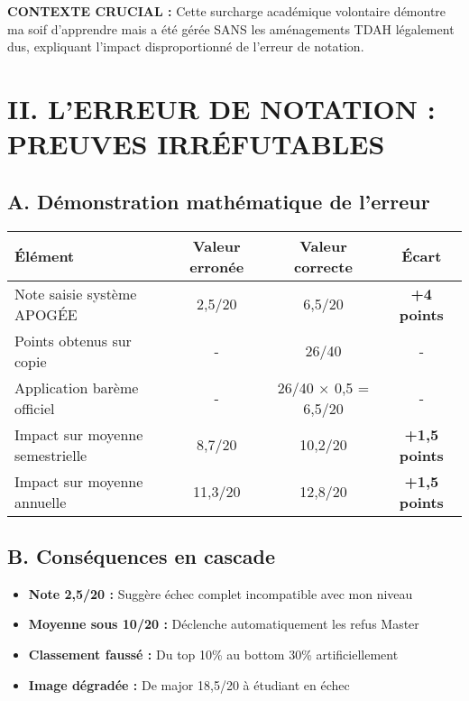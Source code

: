 \documentclass[12pt,french]{scrlttr2}
\begin{document}
\begin{letter}
\colorbox{yellow!20}{\parbox{0.95\textwidth}{
\textbf{CONTEXTE CRUCIAL :} Cette surcharge académique volontaire démontre ma soif d'apprendre mais a été gérée SANS les aménagements TDAH légalement dus, expliquant l'impact disproportionné de l'erreur de notation.
}}

\section*{II. L'ERREUR DE NOTATION : PREUVES IRRÉFUTABLES}

\subsection*{A. Démonstration mathématique de l'erreur}

\begin{center}
\begin{tabular}{|l|c|c|c|}
\hline
\textbf{Élément} & \textbf{Valeur erronée} & \textbf{Valeur correcte} & \textbf{Écart} \\
\hline
Note saisie système APOGÉE & \colorbox{red!30}{2,5/20} & \colorbox{green!30}{6,5/20} & \textbf{+4 points} \\
Points obtenus sur copie & - & 26/40 & - \\
Application barème officiel & - & 26/40 × 0,5 = 6,5/20 & - \\
Impact sur moyenne semestrielle & 8,7/20 & 10,2/20 & \textbf{+1,5 points} \\
Impact sur moyenne annuelle & 11,3/20 & 12,8/20 & \textbf{+1,5 points} \\
\hline
\end{tabular}
\end{center}

\subsection*{B. Conséquences en cascade}

\begin{itemize}[leftmargin=*]
\item \textbf{Note 2,5/20 :} Suggère échec complet incompatible avec mon niveau
\item \textbf{Moyenne sous 10/20 :} Déclenche automatiquement les refus Master
\item \textbf{Classement faussé :} Du top 10\% au bottom 30\% artificiellement
\item \textbf{Image dégradée :} De major 18,5/20 à étudiant en échec
\end{itemize}


\end{letter}
\end{document}
